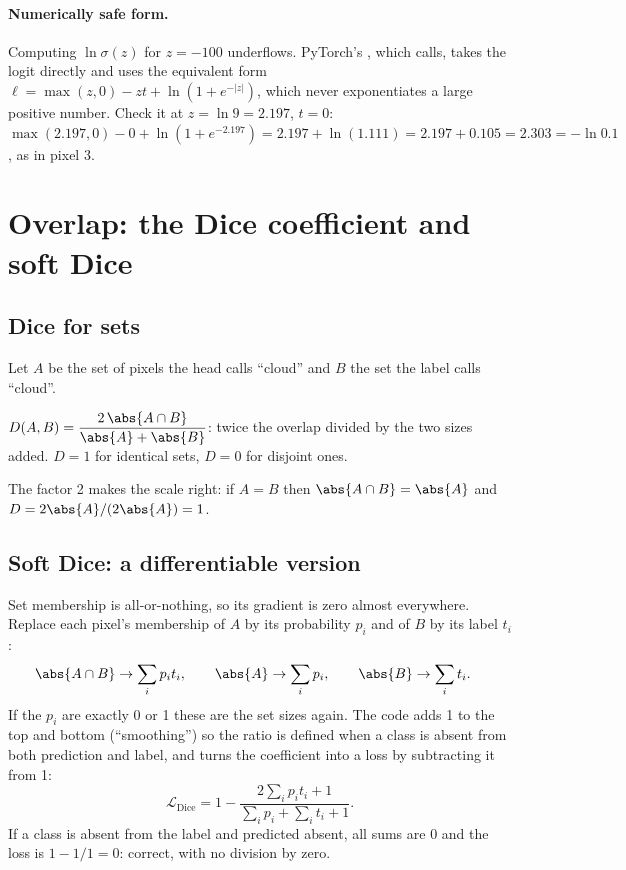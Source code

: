 \paragraph{Numerically safe form.} Computing $\ln\sigma(z)$ for $z = -100$ underflows. PyTorch's
, which  calls, takes the logit directly and uses the equivalent form
$\ell = \max(z, 0) - zt + \ln(1 + e^{-|z|})$, which never exponentiates a large positive number. Check it at $z = \ln 9 = 2.197$, $t = 0$:
$\max(2.197, 0) - 0 + \ln(1 + e^{-2.197}) = 2.197 + \ln(1.111) = 2.197 + 0.105 = 2.303 = -\ln 0.1$, as in pixel 3.

\section{Overlap: the Dice coefficient and soft Dice}\label{sec:seghead:dice}

\subsection{Dice for sets}

Let $A$ be the set of pixels the head calls ``cloud'' and $B$ the set the label calls ``cloud''.
\begin{definition}
$D(A, B) = \dfrac{2\,\abs{A \cap B}}{\abs{A} + \abs{B}}$: twice the overlap divided by the two sizes added. $D = 1$ for identical sets, $D = 0$
for disjoint ones.
\end{definition}
The factor 2 makes the scale right: if $A = B$ then $\abs{A \cap B} = \abs{A}$ and $D = 2\abs{A}/(2\abs{A}) = 1$.

\subsection{Soft Dice: a differentiable version}

Set membership is all-or-nothing, so its gradient is zero almost everywhere. Replace each pixel's membership of $A$ by its probability
$p_i$ and of $B$ by its label $t_i$ \citep{milletari2016vnet}:
\begin{align*}
  \abs{A \cap B} &\to \sum_i p_i t_i, \qquad \abs{A} \to \sum_i p_i, \qquad \abs{B} \to \sum_i t_i.
\end{align*}
If the $p_i$ are exactly 0 or 1 these are the set sizes again. The code adds 1 to the top and bottom (``smoothing'') so the ratio is
defined when a class is absent from both prediction and label, and turns the coefficient into a loss by subtracting it from 1:
\begin{equation}\label{eq:seghead:dice}
  \mathcal{L}_{\text{Dice}} = 1 - \frac{2\sum_i p_i t_i + 1}{\sum_i p_i + \sum_i t_i + 1}.
\end{equation}
If a class is absent from the label and predicted absent, all sums are 0 and the loss is $1 - 1/1 = 0$: correct, with no division by zero.


